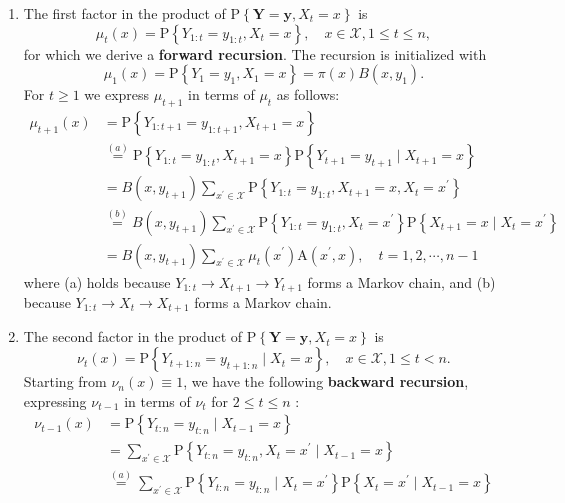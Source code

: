 \documentclass[11pt,a4paper]{article}
\begin{document}
\begin{enumerate}[(1)]
    \item The first factor in the product of $\mathrm{P}\left\{\boldsymbol{Y}=\boldsymbol{y}, X_t=x\right\}$ is
    $$
    \mu_t(x)=\mathrm{P}\left\{Y_{1: t}=y_{1: t}, X_t=x\right\}, \quad x \in \mathcal{X}, 1 \leq t \leq n,
    $$
    for which we derive a \textbf{forward recursion}. The recursion is initialized with
    $$
    \mu_1(x)=\mathrm{P}\left\{Y_1=y_1, X_1=x\right\}=\pi(x) B\left(x, y_1\right) .
    $$
    For $t \geq 1$ we express $\mu_{t+1}$ in terms of $\mu_t$ as follows:
    $$
    \begin{aligned}
    \mu_{t+1}(x) &=\mathrm{P}\left\{Y_{1: t+1}=y_{1: t+1}, X_{t+1}=x\right\} \\
    & \stackrel{(a)}{=} \mathrm{P}\left\{Y_{1: t}=y_{1: t}, X_{t+1}=x\right\} \mathrm{P}\left\{Y_{t+1}=y_{t+1} \mid X_{t+1}=x\right\} \\
    &=B\left(x, y_{t+1}\right) \sum_{x^{\prime} \in \mathcal{X}} \mathrm{P}\left\{Y_{1: t}=y_{1: t}, X_{t+1}=x, X_t=x^{\prime}\right\} \\
    & \stackrel{(b)}{=} B\left(x, y_{t+1}\right) \sum_{x^{\prime} \in \mathcal{X}} \mathrm{P}\left\{Y_{1: t}=y_{1: t}, X_t=x^{\prime}\right\} \mathrm{P}\left\{X_{t+1}=x \mid X_t=x^{\prime}\right\} \\
    &=B\left(x, y_{t+1}\right) \sum_{x^{\prime} \in \mathcal{X}} \mu_t\left(x^{\prime}\right) \mathrm{A}\left(x^{\prime}, x\right), \quad t=1,2, \cdots, n-1
    \end{aligned}
    $$
    where (a) holds because $Y_{1: t} \rightarrow X_{t+1} \rightarrow Y_{t+1}$ forms a Markov chain, and (b) because $Y_{1: t} \rightarrow X_t \rightarrow X_{t+1}$ forms a Markov chain.
    \item The second factor in the product of $\mathrm{P}\left\{\boldsymbol{Y}=\boldsymbol{y}, X_t=x\right\}$ is
    $$
    \nu_t(x)=\mathrm{P}\left\{Y_{t+1: n}=y_{t+1: n} \mid X_t=x\right\}, \quad x \in \mathcal{X}, 1 \leq t<n .
    $$
    Starting from $\nu_n(x) \equiv 1$, we have the following \textbf{backward recursion}, expressing $\nu_{t-1}$ in terms of $\nu_t$ for $2 \leq t \leq n$ :
    $$
    \begin{aligned}
    \nu_{t-1}(x) &=\mathrm{P}\left\{Y_{t: n}=y_{t: n} \mid X_{t-1}=x\right\} \\
    &=\sum_{x^{\prime} \in \mathcal{X}} \mathrm{P}\left\{Y_{t: n}=y_{t: n}, X_t=x^{\prime} \mid X_{t-1}=x\right\} \\
    & \stackrel{(a)}{=} \sum_{x^{\prime} \in \mathcal{X}} \mathrm{P}\left\{Y_{t: n}=y_{t: n} \mid X_t=x^{\prime}\right\} \mathrm{P}\left\{X_t=x^{\prime} \mid X_{t-1}=x\right\} \\

\end{aligned}$$
\end{enumerate}
\end{document}
